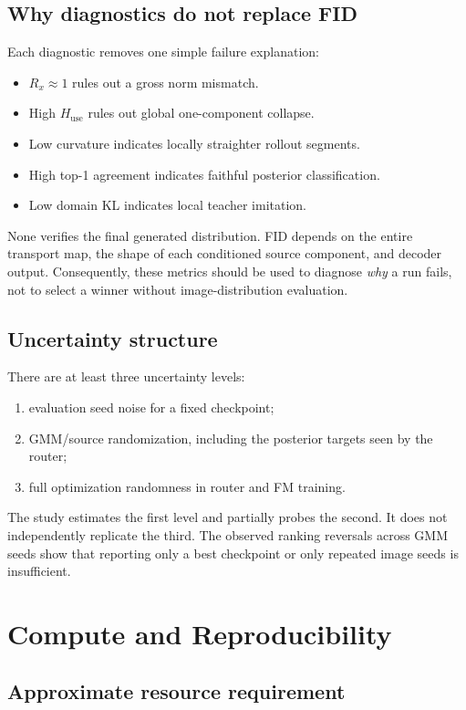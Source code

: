 \documentclass[11pt,a4paper]{article}
\begin{document}
\subsection{Why diagnostics do not replace FID}

Each diagnostic removes one simple failure explanation:
\begin{itemize}
  \item \(R_x\approx1\) rules out a gross norm mismatch.
  \item High \(H_{\mathrm{use}}\) rules out global one-component collapse.
  \item Low curvature indicates locally straighter rollout segments.
  \item High top-1 agreement indicates faithful posterior classification.
  \item Low domain KL indicates local teacher imitation.
\end{itemize}
None verifies the final generated distribution. FID depends on the entire
transport map, the shape of each conditioned source component, and decoder
output.
Consequently, these metrics should be used to diagnose \emph{why} a run fails,
not to select a winner without image-distribution evaluation.

\subsection{Uncertainty structure}

There are at least three uncertainty levels:
\begin{enumerate}
  \item evaluation seed noise for a fixed checkpoint;
  \item GMM/source randomization, including the posterior targets seen by the
  router;
  \item full optimization randomness in router and FM training.
\end{enumerate}
The study estimates the first level and partially probes the second. It does
not independently replicate the third. The observed ranking reversals across
GMM seeds show that reporting only a best checkpoint or only repeated image
seeds is insufficient.

\section{Compute and Reproducibility}

\subsection{Approximate resource requirement}
\end{document}
